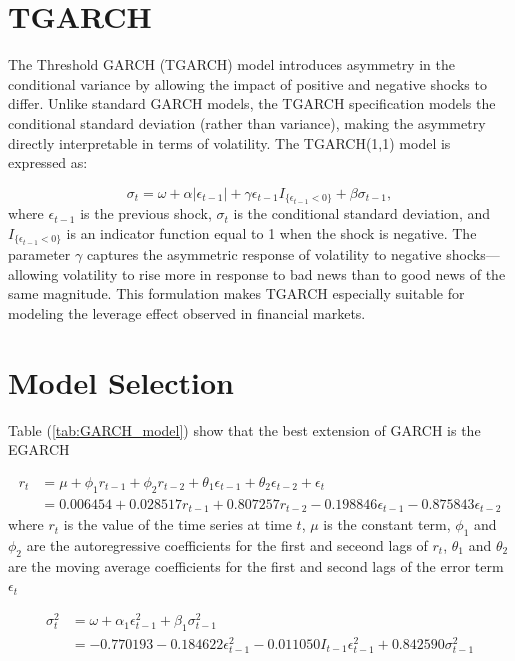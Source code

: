 \section{TGARCH}

The Threshold GARCH (TGARCH) model introduces asymmetry in the conditional variance by allowing the impact of positive and negative shocks to differ. Unlike standard GARCH models, the TGARCH specification models the conditional standard deviation (rather than variance), making the asymmetry directly interpretable in terms of volatility. The TGARCH(1,1) model is expressed as:

\begin{equation}
	\sigma_t = \omega + \alpha |\epsilon_{t-1}| + \gamma \epsilon_{t-1} I_{\{\epsilon_{t-1} < 0\}} + \beta \sigma_{t-1},
\end{equation}
where $\epsilon_{t-1}$ is the previous shock, $\sigma_t$ is the conditional standard deviation, and $I_{\{\epsilon_{t-1} < 0\}}$ is an indicator function equal to 1 when the shock is negative. The parameter $\gamma$ captures the asymmetric response of volatility to negative shocks—allowing volatility to rise more in response to bad news than to good news of the same magnitude. This formulation makes TGARCH especially suitable for modeling the leverage effect observed in financial markets.
\section{Model Selection }

Table (\ref{tab:GARCH_model}) show that the best extension of GARCH is the EGARCH 

\begin{equation}
\begin{aligned}
	r_t &= \mu + \phi_1 r_{t-1} + \phi_2 r_{t-2} + \theta_1 \epsilon_{t-1} + \theta_2 \epsilon_{t-2} + \epsilon_t \\
	& = 0.006454 + 0.028517 r_{t-1} + 0.807257 r_{t-2} - 0.198846 \epsilon_{t-1} - 0.875843 \epsilon_{t-2}
\end{aligned}
\end{equation}
where $r_t$ is the value of the time series at time $t$, $\mu$ is the constant term, $\phi_1$ and $\phi_2$ are the autoregressive coefficients for the first and seceond lags of $r_t$, $\theta_1$ and $\theta_2$ are the moving average coefficients for the first and second lags of the error term $\epsilon_t$

\begin{equation}
	\begin{aligned}
		\sigma_t^2 &= \omega + \alpha_1 \epsilon_{t-1}^2 + \beta_1 \sigma_{t-1}^2 \\
		&= -0.770193 - 0.184622 \epsilon_{t-1}^2 - 0.011050 I_{t-1} \epsilon_{t-1}^2 + 0.842590 \sigma_{t-1}^2
	\end{aligned}
\end{equation}


